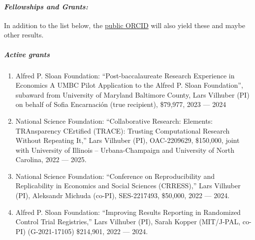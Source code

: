 \documentclass[10pt,letterpaper]{report}
\begin{document}
\paragraph{\it \bf Fellowships and Grants:}
In addition to the list below, the 
\href{http://orcid.org/0000-0001-5733-8932}{public ORCID} will also yield these and maybe other results.
\subparagraph{Active grants}
\begin{enumerate}
  \item Alfred P. Sloan Foundation: ``Post-baccalaureate Research Experience in Economics A UMBC Pilot Application to the Alfred P. Sloan Foundation'', subaward from University of Maryland Baltimore County, Lars Vilhuber (PI) on behalf of Sofia Encarnación (true recipient), \$79,977, 2023 --- 2024
	\item National Science Foundation: ``Collaborative Research: Elements: TRAnsparency CErtified (TRACE): Trusting Computational Research Without Repeating It,'' Lars Vilhuber (PI),  OAC-2209629, \$150,000, joint with University of Illinois -- Urbana-Champaign and University of North Carolina, 2022 --- 2025.
	\item National Science Foundation: ``Conference on Reproducibility and Replicability in Economics and Social Sciences (CRRESS),'' Lars Vilhuber (PI), Aleksandr Michuda (co-PI), SES-2217493, \$50,000,  2022 --- 2024.
 
	\item Alfred P. Sloan Foundation: ``Improving Results Reporting in Randomized Control Trial Registries,'' Lars Vilhuber (PI), Sarah Kopper (MIT/J-PAL, co-PI) (G-2021-17105) \$214,901, 2022 --- 2024.
\end{enumerate}
\end{document}
